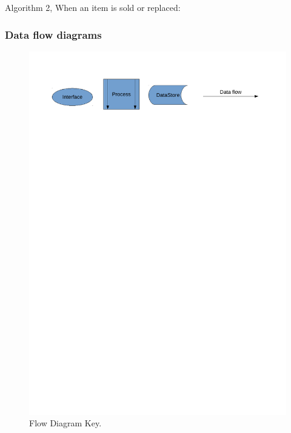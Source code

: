 \begin{algorithm}[H]
    \caption{Algorithm 2, When an item is sold or replaced:}
\begin{algorithmic}[1]
\EndIf
\end{algorithmic}
\end{algorithm}

\subsubsection{Data flow diagrams}

\begin{figure}[H]
    \includegraphics[width=\textwidth]{./Analysis/Dataflow/DFD_analysis_key.pdf}
    \caption{Flow Diagram Key.} \label{fig:print_function_result}
\end{figure}

